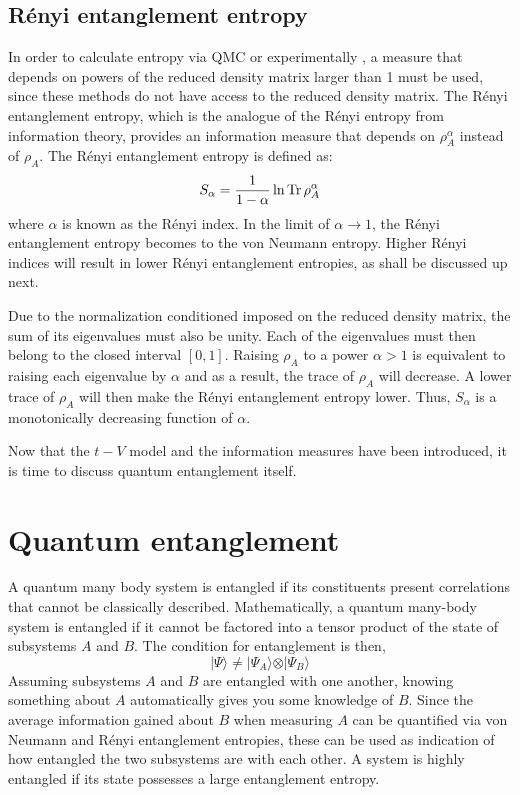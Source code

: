 	\subsection{R\'enyi entanglement entropy}
	
	In order to calculate entropy via QMC or experimentally \cite{Hastings:2010dc, Islam:2015cm}, a measure that depends on powers of the reduced density matrix larger than 1 must be used, since these methods do not have access to the reduced density matrix. The R\'enyi entanglement entropy, which is the analogue of the R\'enyi entropy from information theory, provides an information measure that depends on $\rho_{A}^{\alpha}$ instead of $\rho_{A}$. The R\'enyi entanglement entropy is defined as:
	\begin{equation}
	\label{eq: renyiEE}
	S_{\alpha} = \frac{1}{1-\alpha} \ln \operatorname{Tr} \rho_{A}^{\alpha}
	\end{equation}
	where $\alpha$ is known as the R\'enyi index. In the limit of $\alpha \to 1$, the R\'enyi entanglement entropy becomes to the von Neumann entropy. Higher R\'enyi indices will result in lower R\'enyi entanglement entropies, as shall be discussed up next.
	
	Due to the normalization conditioned imposed on the reduced density matrix, the sum of its eigenvalues must also be unity. Each of the eigenvalues must then belong to the closed interval $\left [ 0,1 \right ]$. Raising $\rho_A$ to a power $\alpha > 1$ is equivalent to raising each eigenvalue by $\alpha$ and as a result, the trace of $\rho_A$ will decrease. A lower trace of $\rho_A$ will then make the R\'enyi entanglement entropy lower. Thus, $S_{\alpha}$ is a monotonically decreasing function of $\alpha$. 
	
	Now that the $t-V$ model and the information measures have been introduced, it is time to discuss quantum entanglement itself.
	
\section{Quantum entanglement}
\label{sec:quantumEntanglement}

	A quantum many body system is entangled if its constituents present correlations that cannot be classically described. 	Mathematically, a quantum many-body system is entangled if it cannot be factored into a tensor product of the state of subsystems $A$ and $B$. The condition for entanglement is then,
%	
	\begin{equation}
	\vert\Psi\rangle \neq \vert\Psi_{A}\rangle \otimes \vert\Psi_{B}\rangle
	\label{eq:entanglementCondition}
	\end{equation}
%
	Assuming subsystems $A$ and $B$ are entangled with one another, knowing something about $A$ automatically gives you some knowledge of $B$. Since the average information gained about $B$ when measuring $A$ can be quantified via von Neumann and R\'enyi entanglement entropies, these can be used as indication of how entangled the two subsystems are with each other. A system is highly entangled if its state possesses a large entanglement entropy.
	
